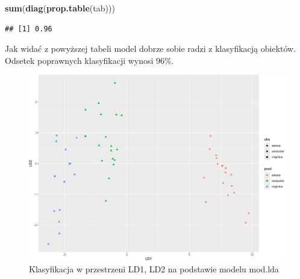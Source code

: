 \documentclass[
]{book}
\newenvironment{Shaded}{\begin{snugshade}}{\end{snugshade}}
\newcommand{\DataTypeTok}[1]{\textcolor[rgb]{0.13,0.29,0.53}{#1}}
\newcommand{\DecValTok}[1]{\textcolor[rgb]{0.00,0.00,0.81}{#1}}
\newcommand{\KeywordTok}[1]{\textcolor[rgb]{0.13,0.29,0.53}{\textbf{#1}}}
\newcommand{\NormalTok}[1]{#1}
\newcommand{\OperatorTok}[1]{\textcolor[rgb]{0.81,0.36,0.00}{\textbf{#1}}}
\newcommand{\StringTok}[1]{\textcolor[rgb]{0.31,0.60,0.02}{#1}}
\theoremstyle{plain}
\theoremstyle{definition}
\theoremstyle{definition}
\theoremstyle{definition}
\theoremstyle{definition}
\theoremstyle{remark}
\begin{document}
\begin{Shaded}
\begin{Highlighting}[]
\KeywordTok{sum}\NormalTok{(}\KeywordTok{diag}\NormalTok{(}\KeywordTok{prop.table}\NormalTok{(tab)))}
\end{Highlighting}
\end{Shaded}

\begin{verbatim}
## [1] 0.96
\end{verbatim}

Jak widać z powyższej tabeli model dobrze sobie radzi z klasyfikacją obiektów. Odsetek poprawnych klasyfikacji wynosi 96\%.

\begin{Shaded}
\end{Shaded}

\begin{figure}

{\centering \includegraphics{EksploracjaDanych_files/figure-latex/unnamed-chunk-59-1} 

}

\caption{Klasyfikacja w przestrzeni LD1, LD2 na podstawie modelu mod.lda}\label{fig:unnamed-chunk-59}
\end{figure}
\end{document}
